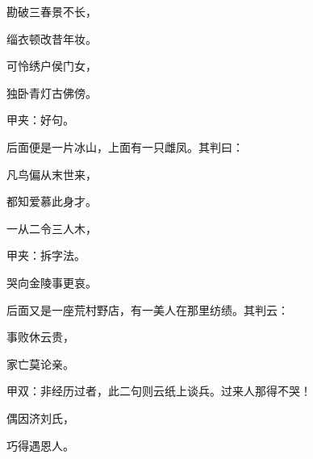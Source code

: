 \begin{poem}
    \begin{pl}勘破三春景不长，\end{pl}

    \begin{pl}缁衣顿改昔年妆。\end{pl}

    \begin{pl}可怜绣户侯门女，\end{pl}

    \begin{pl}独卧青灯古佛傍。\end{pl}

    \begin{note}甲夹：好句。\end{note}
\end{poem}


\begin{parag}
    后面便是一片冰山，上面有一只雌凤。其判曰：
\end{parag}


\begin{poem}
    \begin{pl}凡鸟偏从末世来，\end{pl}

    \begin{pl}都知爱慕此身才。\end{pl}

    \begin{pl}一从二令三人木，\end{pl}\begin{note}甲夹：拆字法。\end{note}

    \begin{pl}哭向金陵事更哀。\end{pl}
\end{poem}


\begin{parag}
    后面又是一座荒村野店，有一美人在那里纺绩。其判云：
\end{parag}


\begin{poem}
    \begin{pl}事败休云贵，\end{pl}

    \begin{pl}家亡莫论亲。\end{pl}\begin{note}甲双：非经历过者，此二句则云纸上谈兵。过来人那得不哭！\end{note}

    \begin{pl}偶因济刘氏，\end{pl}

    \begin{pl}巧得遇恩人。\end{pl}

\end{poem}



